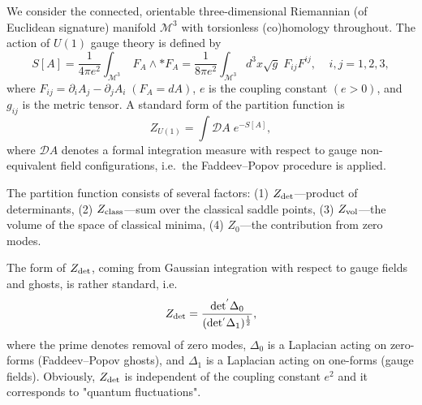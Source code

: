 \documentclass[a4paper,12pt]{article}
\begin{document}
We consider the connected, orientable three-dimensional Riemannian (of
Euclidean signature) manifold $\mathcal{M}^{3}$ with torsionless
(co)homology throughout. The action of $U(1)$ gauge theory is
defined by
\begin{equation}\label{T1}
S[A]= \frac{1}{4 \pi e^{2}}\int_{\mathcal{M}^{3}}\; F_{A}\wedge \ast F_{A}
=\frac{1}{8\pi e^{2}} \int_{\mathcal{M}^3}d^{3}x \sqrt{g}\;
F_{ij}F^{ij},\;\;\;\;           i, j= 1, 2, 3,
\end{equation}
where $F_{ij}=\partial_{i}A_{j}-\partial_{j}A_{i} \; (F_{A}=dA)$, $e$ is the coupling constant $(e>0)$, and $g_{ij}$ is the metric tensor.
A standard form of the partition function is
\begin{equation}\label{T2}
Z_{U(1)}=\int\mathcal{D}A\; e^{- S[A]},
\end{equation}
where $\mathcal{D}A$ denotes a formal integration measure with respect to gauge non-equivalent field configurations, i.e.\ the
Faddeev--Popov procedure is applied.

The partition function consists of several factors:
(1) $Z_{\rm det}$---product of determinants,
(2) $Z_{\rm class}$---sum over the classical saddle points,
(3) $Z_{\rm vol}$---the volume of the space of classical minima,
(4) $Z_{0}$---the contribution from zero modes.

The form of $Z_{\rm det}$, coming from Gaussian integration with respect to gauge fields and ghosts,
is rather standard, i.e.
\begin{equation}\label{T3}
Z_{\rm det}=\frac{\rm det^{'}\Delta_{0} }
{(\rm det^{'}\Delta_{1})^\frac{1}{2}},
\end{equation}
where the prime denotes removal of zero modes,
$\Delta_{0}$ is a Laplacian acting on zero-forms
(Faddeev--Popov ghosts), and $\Delta_{1}$ is a Laplacian acting on
one-forms (gauge fields). Obviously, $Z_{\rm det}$ is independent of the
coupling constant $e^2$ and it corresponds to "quantum fluctuations".
\end{document}
